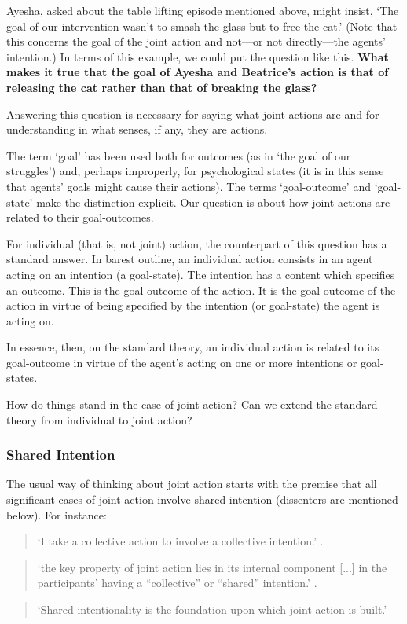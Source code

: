 \documentclass[12pt,a4paper]{extarticle}
\begin{document}
Ayesha, asked about the table lifting episode mentioned above, might insist, `The goal of our intervention wasn't to smash the glass but to free the cat.'  (Note that this concerns the goal of the joint action and not---or not directly---the agents' intention.)  In terms of this example, we could put the question like this.  \textbf{What makes it true that the goal of Ayesha and Beatrice's action is that of releasing the cat rather than that of breaking the glass?}

Answering this question is necessary for saying what joint actions are and for understanding in what senses, if any, they are actions.

The term `goal' has been used both for outcomes (as in `the goal of our struggles') and, perhaps improperly, for psychological states (it is in this sense that agents' goals might cause their actions).  The terms `goal-outcome' and `goal-state' make the distinction explicit.  Our question is about how joint actions are related to their goal-outcomes.

For individual (that is, not joint) action, the counterpart of this question has a standard answer.  In barest outline, an individual action consists in an agent acting on an intention (a goal-state).  The intention has a content which specifies an outcome.
This is the goal-outcome of the action.
It is the goal-outcome of the action in virtue of being specified by the intention (or goal-state) the agent is acting on. 

In essence, then, on the standard theory, an individual action is related to its goal-outcome in virtue of the agent's acting on one or more intentions or goal-states.


How do things stand in the case of joint action?  Can we extend the standard theory from individual to joint action?  


\subsubsection{Shared Intention}


The usual way of thinking about joint action starts with the premise that all significant cases of joint action involve shared intention (dissenters are mentioned below).  For instance:  
%
\begin{quote} 
`I take a collective action to involve a collective intention.'  \citep[p.\ 5]{Gilbert:2006wr}.
\end{quote}
%
\begin{quote}
`the key property of joint action lies in its internal component [...] in the participants’ having a “collective” or “shared” intention.' \citep[pp. 444-5]{alonso_shared_2009}.
\end{quote}
%
\begin{quote}
`Shared intentionality is the foundation upon which joint action is built.' \citep[p.\ 381]{Carpenter:2009wq}
\end{quote}
\end{document}

